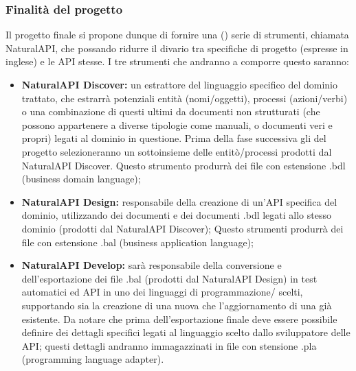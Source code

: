     \subsubsection{Finalità del progetto}
   Il progetto finale si propone dunque di fornire una () serie di strumenti,  chiamata NaturalAPI, che possando ridurre il divario tra specifiche di progetto (espresse in inglese) e le API stesse. I tre strumenti che andranno a comporre questo  saranno:
   \begin{itemize}
   	\item \textbf{NaturalAPI Discover: }un estrattore del linguaggio specifico del dominio trattato, che estrarrà potenziali entità (nomi/oggetti), processi (azioni/verbi) o una combinazione di questi ultimi da documenti non strutturati (che possono appartenere a diverse tipologie come manuali,  o documenti veri e propri) legati al dominio in questione. Prima della fase successiva gli  del progetto selezioneranno un sottoinsieme delle entitò/processi prodotti dal NaturalAPI Discover. Questo strumento produrrà dei file con estensione .bdl (business domain language);

   	\item \textbf{NaturalAPI Design: }responsabile della creazione di un'API specifica del dominio, utilizzando dei documenti  e dei documenti .bdl legati allo stesso dominio (prodotti dal NaturalAPI Discover); Questo strumenti produrrà dei file con estensione .bal (business application language);

   	\item \textbf{NaturalAPI Develop: }sarà responsabile della conversione e dell'esportazione dei file .bal (prodotti dal NaturalAPI Design) in test automatici ed API in uno dei linguaggi di programmazione/ scelti, supportando sia la creazione di una nuova  che l'aggiornamento di una già esistente. Da notare che prima dell'esportazione finale deve essere possibile definire dei dettagli specifici legati al linguaggio scelto dallo sviluppatore delle API; questi dettagli andranno immagazzinati in file con stensione .pla (programming language adapter).
   	\end{itemize}

